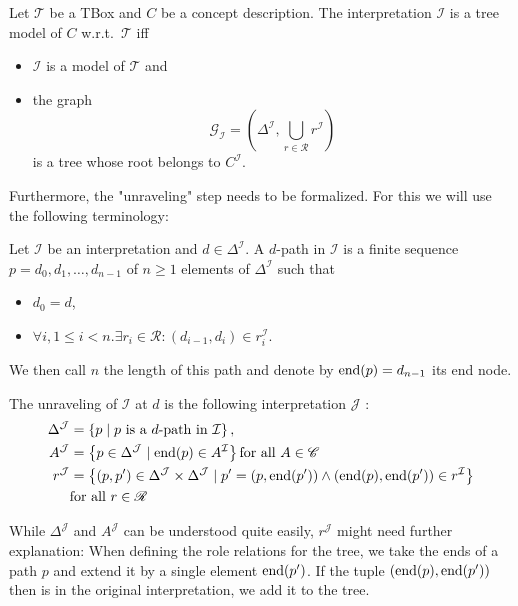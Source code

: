 \begin{definition}\label{def:tree model}
	Let $\mathcal{T}$ be a TBox and $C$ be a concept description.
	The interpretation $\mathcal{I}$ is a tree model of $C$ w.r.t.\ $\mathcal{T}$ iff
	\begin{itemize}
		\item $\mathcal{I}$ is a model of $\mathcal{T}$ and
		\item the graph 
			\[
				\mathcal{G}_{\mathcal{I}} = \left( \Delta^{\mathcal{I}}, \bigcup_{r \in \mathscr{R}} r^{\mathcal{I}} \right)
			\]
			is a tree whose root belongs to $C^{\mathcal{I}}$.
	\end{itemize}
\end{definition}

Furthermore, the "unraveling" step needs to be formalized.
For this we will use the following terminology:

Let $\mathcal{I}$ be an interpretation and $d \in \Delta^{\mathcal{I}}$.
A $d$-path in $\mathcal{I}$ is a finite sequence $p = d_0,d_1,\ldots,d_{n-1}$ of $n \geq 1$ elements of $\Delta^{\mathcal{I}}$ such that
\begin{itemize}
	\item $d_0 = d$,
	\item $\forall i, 1 \leq i < n .\exists r_i \in \mathscr{R}: (d_{i-1},d_i) \in r_{i}^{\mathcal{I}}$.
\end{itemize}
We then call $n$ the length of this path and denote by $\operatorname{\text{end}}(p) = d_{n-1}$ its end node.

\begin{definition}[Unraveling]\label{def:unraveling}
	The unraveling of $\mathcal{I}$ at $d$ is the following interpretation $\mathcal{J}$ :
	\begin{align*}
		\Delta^{\mathcal{J}} &= \left\{ p \mid p \text{ is a $d$-path in $\mathcal{I}$} \right\}, \\
		A^{\mathcal{J}} &= \left\{ p \in \Delta^{\mathcal{J}} \mid \operatorname{\text{end}}(p) \in A^{\mathcal{I}} \right\} \text{for all } A \in \mathscr{C} \\
		r^{\mathcal{J}} &= \left\{ (p,p') \in \Delta^{\mathcal{J}} \times \Delta^{\mathcal{J}} \mid p'=(p, \operatorname{\text{end}}(p')) \land (\operatorname{\text{end}}(p),\operatorname{\text{end}}(p')) \in r^{\mathcal{I}} \right\} \\
						&\text{for all } r \in \mathscr{R}
	\end{align*}
\end{definition}
\begin{note}
	While $\Delta^{\mathcal{J}}$ and $A^{\mathcal{J}}$ can be understood quite easily, $r^{\mathcal{J}}$ might need further explanation:
	When defining the role relations for the tree, we take the ends of a path $p$
	and extend it by a single element $\operatorname{\text{end}}(p')$. If the tuple $(\operatorname{\text{end}}(p), \operatorname{\text{end}}(p'))$ then is in the original interpretation,
	we add it to the tree.
\end{note}

